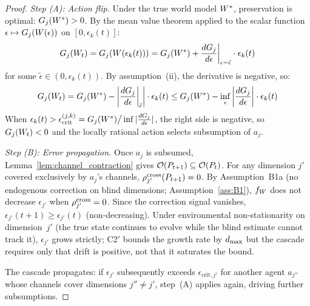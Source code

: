 \begin{proof}
\emph{Step (A): Action flip.}
Under the true world model $W^*$, preservation is optimal:
$G_j(W^*) > 0$.  By the mean value theorem applied to the
scalar function $\epsilon \mapsto G_j(W(\epsilon))$ on
$[0, \epsilon_k(t)]$:
\begin{equation*}
G_j(W_t) = G_j(W(\epsilon_k(t)))
  = G_j(W^*) +
  \frac{d G_j}{d\epsilon}\bigg|_{\epsilon = \tilde{\epsilon}}
  \cdot \epsilon_k(t)
\end{equation*}
for some $\tilde{\epsilon} \in (0, \epsilon_k(t))$.  By
assumption~(ii), the derivative is negative, so:
\begin{equation*}
G_j(W_t) = G_j(W^*)
  - \left|\frac{d G_j}{d\epsilon}\bigg|_{\tilde{\epsilon}}\right|
  \cdot \epsilon_k(t)
  \leq G_j(W^*)
  - \inf_{\epsilon} \left|\frac{d G_j}{d\epsilon}\right|
  \cdot \epsilon_k(t)
\end{equation*}
When $\epsilon_k(t) > \epsilon_{\mathrm{crit}}^{(j,k)} =
G_j(W^*) \big/ \inf |\frac{d G_j}{d\epsilon}|$, the right side is
negative, so $G_j(W_t) < 0$ and the locally rational action
selects subsumption of $a_j$.

\emph{Step (B): Error propagation.}
Once $a_j$ is subsumed, Lemma~\ref{lem:channel_contraction} gives
$\mathcal{O}(P_{t+1}) \subseteq \mathcal{O}(P_t)$.  For any dimension $j'$
covered exclusively by $a_j$'s channels, $\rho^{\mathrm{cross}}_{j'}(P_{t+1})
= 0$.  By Assumption~B1a (no endogenous correction on blind dimensions;
Assumption~\ref{ass:B1}), $f_{W}$ does not decrease
$\epsilon_{j'}$ when $\rho^{\mathrm{cross}}_{j'} = 0$.  Since the correction
signal vanishes, $\epsilon_{j'}(t+1) \geq \epsilon_{j'}(t)$
(non-decreasing).  Under environmental non-stationarity on
dimension~$j'$ (the true state continues to evolve while the blind
estimate cannot track it), $\epsilon_{j'}$ grows strictly; C2$'$
bounds the growth rate by $d_{\mathrm{max}}$ but the cascade requires only that
drift is positive, not that it saturates the bound.

The cascade propagates: if $\epsilon_{j'}$ subsequently exceeds
$\epsilon_{\mathrm{crit},j'}$ for another agent $a_{j''}$ whose channels
cover dimensions $j'' \neq j'$, step~(A) applies again, driving
further subsumptions.


\end{proof}
